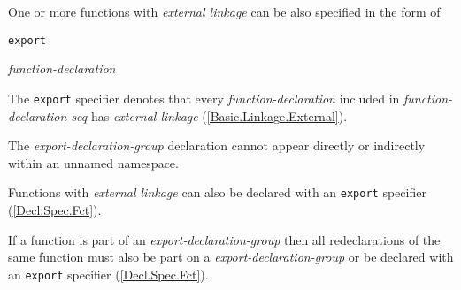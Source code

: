 
\p One or more functions with \textit{external linkage} can be also specified in the form of

\begin{grammar}
  \br
  \texttt{export} \terminal{\{}  \terminal{\}}\br

  \br
  \textit{function-declaration} 
\end{grammar}

\p The \texttt{export} specifier denotes that every \textit{function-declaration} included in \textit{function-declaration-seq} has \textit{external linkage} (\ref{Basic.Linkage.External}).

\p The \textit{export-declaration-group} declaration cannot appear directly or indirectly within an unnamed namespace.

\p Functions with \textit{external linkage} can also be declared with an \texttt{export} specifier (\ref{Decl.Spec.Fct}).

\p If a function is part of an \textit{export-declaration-group} then all redeclarations of the same function must also be part on a \textit{export-declaration-group} or be declared with an \texttt{export} specifier (\ref{Decl.Spec.Fct}).
